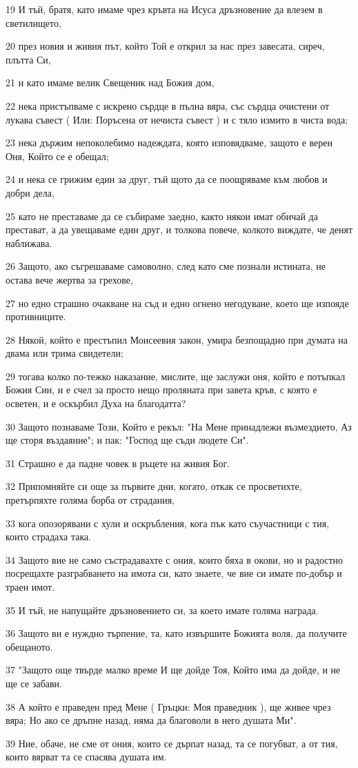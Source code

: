 \par 19 И тъй, братя, като имаме чрез кръвта на Исуса дръзновение да влезем в светилището,
\par 20 през новия и живия път, който Той е открил за нас през завесата, сиреч, плътта Си,
\par 21 и като имаме велик Свещеник над Божия дом,
\par 22 нека пристъпваме с искрено сърдце в пълна вяра, със сърдца очистени от лукава съвест ( Или: Поръсена от нечиста съвест ) и с тяло измито в чиста вода;
\par 23 нека държим непоколебимо надеждата, която изповядваме, защото е верен Оня, Който се е обещал;
\par 24 и нека се грижим един за друг, тъй щото да се поощряваме към любов и добри дела,
\par 25 като не преставаме да се събираме заедно, както някои имат обичай да престават, а да увещаваме един друг, и толкова повече, колкото виждате, че денят наближава.
\par 26 Защото, ако съгрешаваме самоволно, след като сме познали истината, не остава вече жертва за грехове,
\par 27 но едно страшно очакване на съд и едно огнено негодуване, което ще изпояде противниците.
\par 28 Някой, който е престъпил Моисеевия закон, умира безпощадно при думата на двама или трима свидетели;
\par 29 тогава колко по-тежко наказание, мислите, ще заслужи оня, който е потъпкал Божия Син, и е счел за просто нещо проляната при завета кръв, с която е осветен, и е оскърбил Духа на благодатта?
\par 30 Защото познаваме Този, Който е рекъл: "На Мене принадлежи възмездието, Аз ще сторя въздаяние"; и пак: "Господ ще съди людете Си".
\par 31 Страшно е да падне човек в ръцете на живия Бог.
\par 32 Припомняйте си още за първите дни, когато, откак се просветихте, претърпяхте голяма борба от страдания,
\par 33 кога опозорявани с хули и оскръбления, кога пък като съучастници с тия, които страдаха така.
\par 34 Защото вие не само състрадавахте с ония, които бяха в окови, но и радостно посрещахте разграбването на имота си, като знаете, че вие си имате по-добър и траен имот.
\par 35 И тъй, не напущайте дръзновението си, за което имате голяма награда.
\par 36 Защото ви е нуждно търпение, та, като извършите Божията воля, да получите обещаното.
\par 37 "Защото още твърде малко време И ще дойде Тоя, Който има да дойде, и не ще се забави.
\par 38 А който е праведен пред Мене ( Гръцки: Моя праведник ), ще живее чрез вяра; Но ако се дръпне назад, няма да благоволи в него душата Ми".
\par 39 Ние, обаче, не сме от ония, които се дърпат назад, та се погубват, а от тия, които вярват та се спасява душата им.

